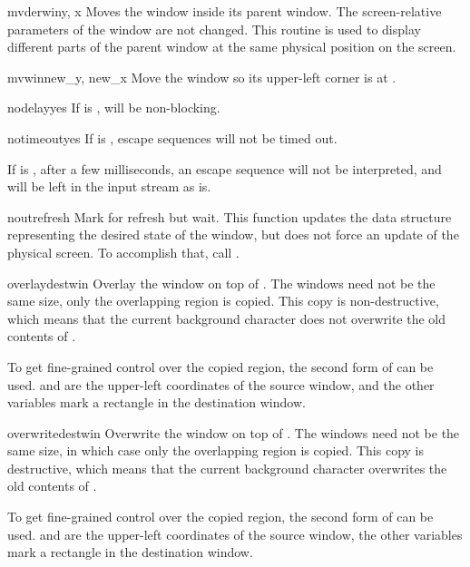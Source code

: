 \begin{methoddesc}{mvderwin}{y, x}
Moves the window inside its parent window.  The screen-relative
parameters of the window are not changed.  This routine is used to
display different parts of the parent window at the same physical
position on the screen.
\end{methoddesc}

\begin{methoddesc}{mvwin}{new_y, new_x}
Move the window so its upper-left corner is at
.
\end{methoddesc}

\begin{methoddesc}{nodelay}{yes}
If  is ,  will be non-blocking.
\end{methoddesc}

\begin{methoddesc}{notimeout}{yes}
If  is , escape sequences will not be timed out.

If  is , after a few milliseconds, an escape sequence
will not be interpreted, and will be left in the input stream as is.
\end{methoddesc}

\begin{methoddesc}{noutrefresh}{}
Mark for refresh but wait.  This function updates the data structure
representing the desired state of the window, but does not force
an update of the physical screen.  To accomplish that, call 
.
\end{methoddesc}

\begin{methoddesc}{overlay}{destwin}
Overlay the window on top of . The windows need not be
the same size, only the overlapping region is copied. This copy is
non-destructive, which means that the current background character
does not overwrite the old contents of .

To get fine-grained control over the copied region, the second form
of  can be used.  and  are
the upper-left coordinates of the source window, and the other variables
mark a rectangle in the destination window.
\end{methoddesc}

\begin{methoddesc}{overwrite}{destwin}
Overwrite the window on top of . The windows need not be
the same size, in which case only the overlapping region is
copied. This copy is destructive, which means that the current
background character overwrites the old contents of .

To get fine-grained control over the copied region, the second form
of  can be used.  and  are
the upper-left coordinates of the source window, the other variables
mark a rectangle in the destination window.
\end{methoddesc}

